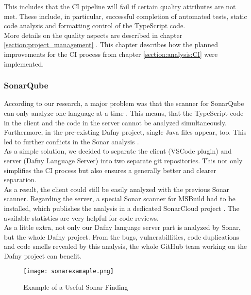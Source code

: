 This includes that the CI pipeline will fail if certain quality attributes are not met.
These include, in particular, successful completion of automated tests,
static code analysis and formatting control of the TypeScript code. \\

More details on the quality aspects are described in chapter \ref{section:project_management} .
This chapter describes how the planned improvements for the CI process from chapter \ref{section:analysis:CI} were implemented.

\subsubsection{SonarQube}
According to our research, a major problem was that the scanner for SonarQube can only analyze one language at a time \cite{sonar-supports-only-one-language}.
This means, that the TypeScript code in the client and the \CsharpWithSpace code in the server cannot be analyzed simultaneously.
Furthermore, in the pre-existing Dafny project, single Java files appear, too.
This led to further conflicts in the Sonar analysis \cite{sa}.\\

As a simple solution, we decided to separate the client (VSCode plugin) and server (Dafny Language Server) into two separate git repositories.
This not only simplifies the CI process but also ensures a generally better and clearer separation. \\

As a result, the client could still be easily analyzed with the previous Sonar scanner.
Regarding the server, a special Sonar scanner for MSBuild had to be installed, which publishes the analysis in a dedicated SonarCloud project \cite{dev}.
The available statistics are very helpful for code reviews.\\

As a little extra, not only our Dafny language server part is analyzed by Sonar,
but the whole Dafny project.
From the bugs, vulnerabillities, code duplications and code smells revealed
by this analysis, the whole GitHub team working on the Dafny project can benefit. \\

\begin{figure}[H]
    \centering
    \texttt{[image: sonarexamaple.png]}
    \caption{Example of a Useful Sonar Finding}
    \label{fig:sonarexample}
\end{figure}

